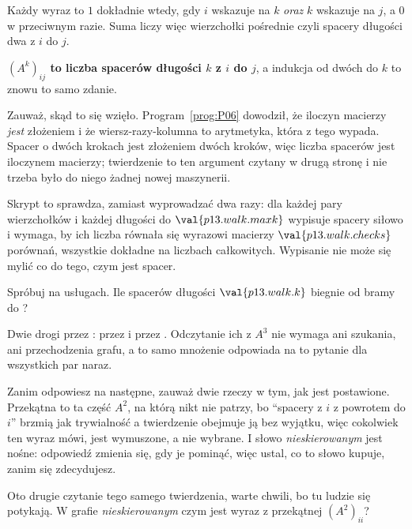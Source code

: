 \begin{fr}
\begin{ansblock}
Każdy wyraz to $1$ dokładnie wtedy, gdy $i$ wskazuje na $k$ \emph{oraz} $k$
wskazuje na $j$, a $0$ w przeciwnym razie. Suma liczy więc wierzchołki
pośrednie \dash{} czyli spacery długości dwa z $i$ do $j$.
\end{ansblock}

\textbf{$(A^{k})_{ij}$ to liczba spacerów długości $k$ z $i$ do $j$}, a
indukcja od dwóch do $k$ to znowu to samo zdanie.

Zauważ, skąd to się wzięło. Program~\ref{prog:P06} dowodził, że iloczyn
macierzy \emph{jest} złożeniem i że wiersz-razy-kolumna to arytmetyka, która z
tego wypada. Spacer o dwóch krokach jest złożeniem dwóch kroków, więc liczba
spacerów jest iloczynem macierzy; twierdzenie to ten argument czytany w drugą
stronę i nie trzeba było do niego żadnej nowej maszynerii.

\begin{note}
Skrypt to sprawdza, zamiast wyprowadzać dwa razy: dla każdej pary
wierzchołków i każdej długości do $\val{p13.walk.maxk}$ wypisuje spacery
siłowo i wymaga, by ich liczba równała się wyrazowi macierzy \dash{}
$\val{p13.walk.checks}$ porównań, wszystkie dokładne na liczbach całkowitych.
Wypisanie nie może się mylić co do tego, czym jest spacer.
\end{note}
\end{fr}

\begin{fr}
Spróbuj na usługach. Ile spacerów długości $\val{p13.walk.k}$ biegnie od bramy
do ?
\nextframe
\end{fr}

\begin{fr}
Dwie drogi przez : przez  i przez .
Odczytanie ich z $A^{3}$ nie wymaga ani szukania, ani przechodzenia grafu, a
to samo mnożenie odpowiada na to pytanie dla wszystkich par naraz.

Zanim odpowiesz na następne, zauważ dwie rzeczy w tym, jak jest postawione.
Przekątna to ta część $A^{2}$, na którą nikt nie patrzy, bo \enquote{spacery
z $i$ z powrotem do $i$} brzmią jak trywialność \dash{} a twierdzenie
obejmuje ją bez wyjątku, więc cokolwiek ten wyraz mówi, jest wymuszone, a
nie wybrane. I słowo \emph{nieskierowanym} jest nośne: odpowiedź zmienia
się, gdy je pominąć, więc ustal, co to słowo kupuje, zanim się zdecydujesz.

Oto drugie czytanie tego samego twierdzenia, warte chwili, bo tu ludzie się
potykają. W grafie \emph{nieskierowanym} czym jest wyraz z przekątnej
$(A^{2})_{ii}$?
\dotline
\nextframe
\end{fr}

